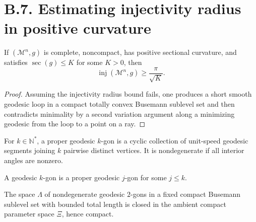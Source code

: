 \section*{B.7. Estimating injectivity radius in positive curvature}

\begin{theorem}
\label{appb-thm-inj-radius-positive-curvature}


If $(\mathcal M^n,g)$ is complete, noncompact, has positive sectional curvature, and satisfies $\sec(g)\le K$ for some $K>0$, then
\[
\operatorname{inj}(\mathcal M^n,g)\ge \frac{\pi}{\sqrt K}.
\]
\end{theorem}

\begin{proof}
\sketch Assuming the injectivity radius bound fails, one produces a short smooth geodesic loop in a compact totally convex Busemann sublevel set and then contradicts minimality by a second variation argument along a minimizing geodesic from the loop to a point on a ray.
\end{proof}

\begin{definition}
\label{appb-def-proper-geodesic-k-gon}

For $k\in\mathbb N^*$, a proper geodesic $k$-gon is a cyclic collection of unit-speed geodesic segments joining $k$ pairwise distinct vertices. It is nondegenerate if all interior angles are nonzero.
\end{definition}

\begin{definition}
\label{appb-def-geodesic-k-gon}


A geodesic $k$-gon is a proper geodesic $j$-gon for some $j\le k$.
\end{definition}

\begin{lemma}
\label{appb-lem-polygon-space-compact}


The space $\Lambda$ of nondegenerate geodesic $2$-gons in a fixed compact Busemann sublevel set with bounded total length is closed in the ambient compact parameter space $\Xi$, hence compact.
\end{lemma}

